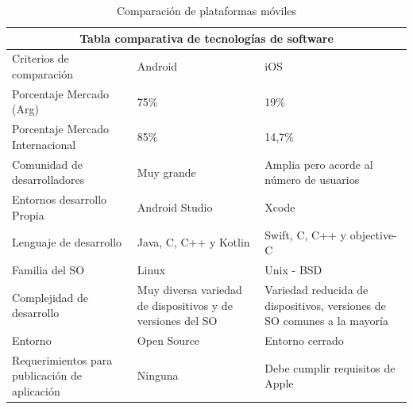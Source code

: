         \begin{table}[h]
            \centering
            \begin{tabularx}{\textwidth}{|X|X|X|}
                 \hline
                 \multicolumn{3}{|c|}{Tabla comparativa de tecnologías de software}\\
                 \hline
                 Criterios de comparación & Android & iOS \\
                 \hline
                 \hline
                 
                 Porcentaje Mercado (Arg) & 75\% & 19\%  \\
                 \hline
                 
                 Porcentaje Mercado Internacional & 85\% & 14,7\% \\
                 \hline
                 
                 Comunidad de desarrolladores & Muy grande & Amplia pero acorde al número de usuarios\\
                 \hline
                 
                  Entornos desarrollo Propia & Android Studio & Xcode\\
                 \hline
                 
                 Lenguaje de desarrollo & Java, C, C++ y Kotlin & Swift, C, C++ y objective-C\\
                 \hline
                 
                 Familia del SO & Linux & Unix - BSD\\
                 \hline
                 
                 Complejidad de desarrollo & Muy diversa variedad de dispositivos y de versiones del SO & Variedad reducida de dispositivos, versiones de SO comunes a la mayoría\\
                 \hline
                 
                 Entorno & Open Source & Entorno cerrado \\
                 \hline
                 
                 Requerimientos para publicación de aplicación & Ninguna & Debe cumplir requisitos de Apple\\
                 \hline
                 
            \end{tabularx}
            \caption{Comparación de plataformas móviles}
            \label{tab:ComparacionPlataformasMoviles}
        \end{table}

